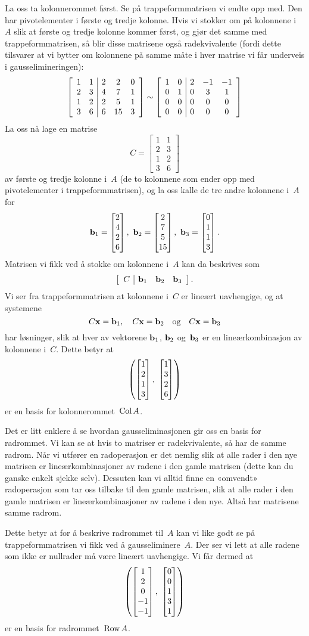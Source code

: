 \begin{ex}
La oss ta kolonnerommet først.  Se på trappeformmatrisen vi endte opp
med.  Den har pivotelementer i første og tredje kolonne.  Hvis vi
stokker om på kolonnene i~$A$ slik at første og tredje kolonne kommer
først, og gjør det samme med trappeformmatrisen, så blir disse
matrisene også radekvivalente (fordi dette tilsvarer at vi bytter om
kolonnene på samme måte i hver matrise vi får underveis i
gausselimineringen):
\[
\left[
\begin{array}{cc|ccc}
1 & 1 & 2 &  2 & 0 \\
2 & 3 & 4 &  7 & 1 \\
1 & 2 & 2 &  5 & 1 \\
3 & 6 & 6 & 15 & 3
\end{array}
\right]
\sim
\left[
\begin{array}{cc|ccc}
1 & 0 & 2 & -1 & -1 \\
0 & 1 & 0 &  3 & 1 \\
0 & 0 & 0 &  0 & 0 \\
0 & 0 & 0 &  0 & 0
\end{array}
\right]
\]
La oss nå lage en matrise
\[
C =
\begin{bmatrix}
1 & 1 \\
2 & 3 \\
1 & 2 \\
3 & 6
\end{bmatrix}
\]
av første og tredje kolonne i~$A$ (de to kolonnene som ender opp med
pivotelementer i trappeformmatrisen), og la oss kalle de tre andre
kolonnene i~$A$ for
\[
\b_1 = \vvvv{2}{4}{2}{6},\ %
\b_2 = \vvvv{2}{7}{5}{15},\ %
\b_3 = \vvvv{0}{1}{1}{3}.
\]
Matrisen vi fikk ved å stokke om kolonnene i~$A$ kan da beskrives som
\[
\left[
\begin{array}{c|ccc}
C & \mathbf{b}_1 & \mathbf{b}_2 & \mathbf{b}_3
\end{array}
\right].
\]
Vi ser fra trappeformmatrisen at kolonnene i~$C$ er lineært
uavhengige, og at systemene
\[
C \mathbf{x} = \mathbf{b}_1,\quad
C \mathbf{x} = \mathbf{b}_2\quad\text{og}\quad
C \mathbf{x} = \mathbf{b}_3
\]
har løsninger, slik at hver av vektorene $\mathbf{b}_1$, $\mathbf{b}_2$ og~$\mathbf{b}_3$ er
en lineærkombinasjon av kolonnene i~$C$.  Dette betyr at
\[
\left(
\vvvv{1}{2}{1}{3},\ %
\vvvv{1}{3}{2}{6}
\right)
\]
er en basis for kolonnerommet~$\operatorname{Col} A$.

Det er litt enklere å se hvordan gausseliminasjonen gir oss en basis
for radrommet.  Vi kan se at hvis to matriser er radekvivalente, så
har de samme radrom.  Når vi utfører en radoperasjon er det nemlig
slik at alle rader i den nye matrisen er lineærkombinasjoner av radene
i den gamle matrisen (dette kan du ganske enkelt sjekke selv).
Dessuten kan vi alltid finne en «omvendt» radoperasjon som tar oss
tilbake til den gamle matrisen, slik at alle rader i den gamle
matrisen er lineærkombinasjoner av radene i den nye.  Altså har
matrisene samme radrom.

Dette betyr at for å beskrive radrommet til~$A$ kan vi like godt se på
trappeformmatrisen vi fikk ved å gausseliminere~$A$.  Der ser vi lett
at alle radene som ikke er nullrader må være lineært uavhengige.  Vi
får dermed at
\[
\left(
\vvvvv{1}{2}{0}{-1}{-1},\ %
\vvvvv{0}{0}{1}{3}{1}
\right)
\]
er en basis for radrommet~$\operatorname{Row} A$.
\end{ex}

